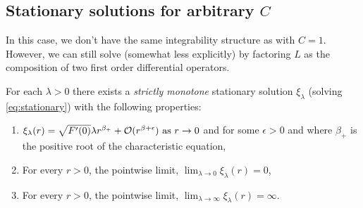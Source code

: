 \documentclass{amsart}
\begin{document}
\subsection{Stationary solutions for arbitrary \(C\)}

In this case, we don't have the same integrability structure as with \(C = 1\). However, we can still solve (somewhat less explicitly) by factoring \(L\) as the composition of two first order differential operators.

\begin{lemma}
\label{lem:stationaryC}
For each \(\lambda > 0 \) there exists a \emph{strictly monotone} stationary solution \(\xi_{\lambda}\) (solving \eqref{eq:stationary}) with the following properties:
\begin{enumerate}
\item \(\xi_{\lambda} (r) = \sqrt{F'(0)} \lambda r^{\beta_+} + \operatorname{\mathcal{O}}(r^{\beta + \epsilon}) \text{ as } r \to 0\) and for some \(\epsilon > 0\) and where \(\beta_+\) is the positive root of the characteristic equation, \label{itm:stationaryC_asymptotic}
\item For every \(r > 0\), the pointwise limit, \(\lim_{\lambda \to 0} \xi_{\lambda} (r) = 0\), \label{itm:stationaryC_lambda_0}
\item For every \(r > 0\), the pointwise limit, \(\lim_{\lambda \to \infty} \xi_{\lambda} (r) = \infty\). \label{itm:stationaryC_lambda_infty}
\end{enumerate}
\end{lemma}
\end{document}
